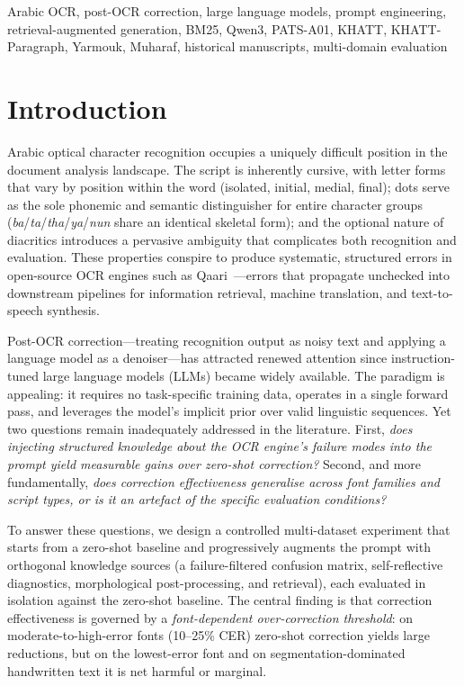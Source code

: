 \documentclass[conference]{IEEEtran}
\begin{document}
\begin{IEEEkeywords}
Arabic OCR, post-OCR correction, large language models, prompt engineering,
retrieval-augmented generation, BM25, Qwen3, PATS-A01, KHATT, KHATT-Paragraph,
Yarmouk, Muharaf, historical manuscripts, multi-domain evaluation
\end{IEEEkeywords}

\section{Introduction}

Arabic optical character recognition occupies a uniquely difficult position
in the document analysis landscape. The script is inherently cursive, with
letter forms that vary by position within the word (isolated, initial, medial,
final); dots serve as the sole phonemic and semantic distinguisher for entire
character groups (\textit{ba}/\textit{ta}/\textit{tha}/\textit{ya}/\textit{nun}
share an identical skeletal form); and the optional nature of diacritics
introduces a pervasive ambiguity that complicates both recognition and
evaluation. These properties conspire to produce systematic, structured errors
in open-source OCR engines such as Qaari~\cite{qaari}---errors that propagate
unchecked into downstream pipelines for information retrieval, machine
translation, and text-to-speech synthesis.

Post-OCR correction---treating recognition output as noisy text and applying a
language model as a denoiser---has attracted renewed attention since
instruction-tuned large language models (LLMs) became widely available. The
paradigm is appealing: it requires no task-specific training data, operates in a
single forward pass, and leverages the model's implicit prior over valid
linguistic sequences. Yet two questions remain inadequately addressed in the
literature. First, \emph{does injecting structured knowledge about the OCR
engine's failure modes into the prompt yield measurable gains over zero-shot
correction?} Second, and more fundamentally, \emph{does correction effectiveness
generalise across font families and script types, or is it an artefact of the
specific evaluation conditions?}

To answer these questions, we design a controlled multi-dataset experiment that
starts from a zero-shot baseline and progressively augments the prompt with
orthogonal knowledge sources (a failure-filtered confusion matrix,
self-reflective diagnostics, morphological post-processing, and retrieval),
each evaluated in isolation against the zero-shot baseline. The central finding
is that correction effectiveness is governed by a \emph{font-dependent
over-correction threshold}: on moderate-to-high-error fonts (10--25\% CER)
zero-shot correction yields large reductions, but on the lowest-error font and
on segmentation-dominated handwritten text it is net harmful or marginal.
\end{document}
